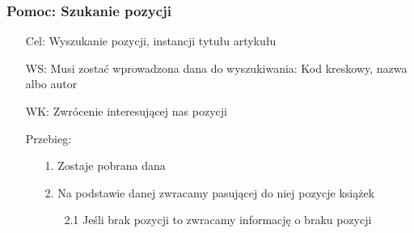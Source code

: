 \documentclass{article}
\begin{document}
	\subsubsection{Pomoc: Szukanie pozycji}
	\begin{enumerate}
		\item[Cel:] Wyszukanie pozycji, instancji tytułu artykułu
		\item[WS:] Musi zostać wprowadzona dana do wyszukiwania: Kod kreskowy, nazwa albo autor
		\item[WK:] Zwrócenie interesującej nas pozycji
		\item[Przebieg:]
	\begin{enumerate}
		\item [1.]Zostaje pobrana dana
		\item [2.]Na podstawie danej zwracamy pasującej do niej pozycje książek
		\begin{enumerate}
		\item [2.1] Jeśli brak pozycji to zwracamy informację o braku pozycji
		\end{enumerate}
	\end{enumerate}
	\end{enumerate}
\end{document}
